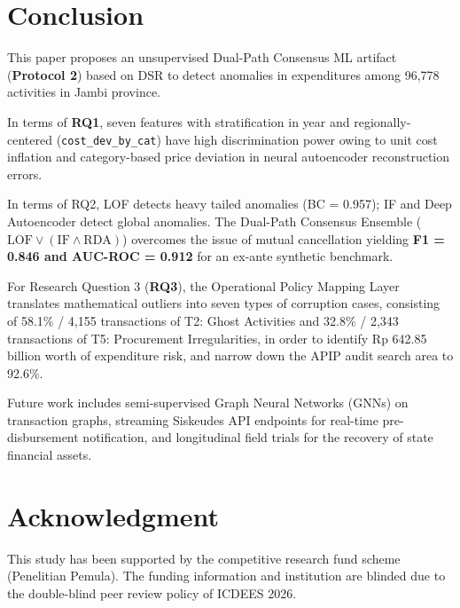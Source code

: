 \documentclass[conference]{IEEEtran}
\begin{document}
\section{Conclusion}

This paper proposes an unsupervised Dual-Path Consensus ML artifact (\textbf{Protocol 2}) based on DSR to detect anomalies in expenditures among 96,778 activities in Jambi province.

In terms of \textbf{RQ1}, seven features with stratification in year and regionally-centered (\texttt{cost\_dev\_by\_cat}) have high discrimination power owing to unit cost inflation and category-based price deviation in neural autoencoder reconstruction errors.

In terms of RQ2, LOF detects heavy tailed anomalies (BC = 0.957); IF and Deep Autoencoder detect global anomalies. The Dual-Path Consensus Ensemble ($\text{LOF} \lor (\text{IF} \land \text{RDA})$) overcomes the issue of mutual cancellation yielding \textbf{F1 = 0.846 and AUC-ROC = 0.912} for an ex-ante synthetic benchmark.

For Research Question 3 (\textbf{RQ3}), the Operational Policy Mapping Layer translates mathematical outliers into seven types of corruption cases, consisting of 58.1\% / 4,155 transactions of T2: Ghost Activities and 32.8\% / 2,343 transactions of T5: Procurement Irregularities, in order to identify Rp 642.85 billion worth of expenditure risk, and narrow down the APIP audit search area to 92.6\%.

Future work includes semi-supervised Graph Neural Networks (GNNs) on transaction graphs, streaming Siskeudes API endpoints for real-time pre-disbursement notification, and longitudinal field trials for the recovery of state financial assets.

\section*{Acknowledgment}
This study has been supported by the competitive research fund scheme (Penelitian Pemula). The funding information and institution are blinded due to the double-blind peer review policy of ICDEES 2026.
\end{document}
